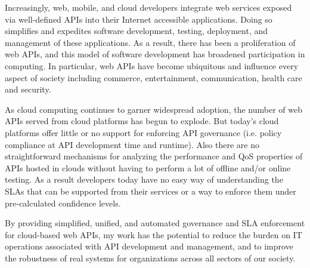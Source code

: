Increasingly, web, mobile, and cloud developers integrate
web services 
exposed via well-defined APIs into their Internet accessible applications.  
Doing so simplifies and expedites software development, testing, 
deployment, and management of these applications. As a result, there has been 
a proliferation of web APIs, and this model
of software development has broadened participation in computing.
In particular, web APIs have become ubiquitous and influence every 
aspect of society including commerce, entertainment, communication, 
health care and security.  

As cloud computing continues to garner widespread adoption, the number 
of web APIs served from cloud platforms has begun to explode. But
today's cloud platforms offer little or no support for enforcing API governance
(i.e. policy compliance at API development time and runtime). 
Also there are no straightforward mechanisms
for analyzing the performance and QoS properties of APIs hosted in clouds
without having to
perform a lot of offline and/or online testing. As a result developers today have
no easy way of understanding the SLAs that can be supported from their services or
a way to enforce them under pre-calculated confidence levels.

By providing simplified, unified,
and automated governance and SLA enforcement for cloud-based 
web APIs, my work has the potential 
to reduce the burden on IT operations associated with 
API development and management, and to improve the robustness of real systems for
organizations across all sectors of our society.